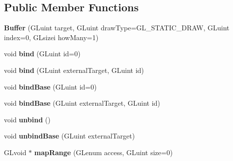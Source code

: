 \subsection*{Public Member Functions}
\begin{DoxyCompactItemize}
\item 
\hypertarget{classfillwave_1_1core_1_1Buffer_a0eb4bd71707615e42f8b9c5c6b35b4fa}{}{\bfseries Buffer} (G\+Luint target, G\+Luint draw\+Type=G\+L\+\_\+\+S\+T\+A\+T\+I\+C\+\_\+\+D\+R\+A\+W, G\+Luint index=0, G\+Lsizei how\+Many=1)\label{classfillwave_1_1core_1_1Buffer_a0eb4bd71707615e42f8b9c5c6b35b4fa}

\item 
\hypertarget{classfillwave_1_1core_1_1Buffer_a7d6935f9b25cfb6e66445ad407bf9c89}{}void {\bfseries bind} (G\+Luint id=0)\label{classfillwave_1_1core_1_1Buffer_a7d6935f9b25cfb6e66445ad407bf9c89}

\item 
\hypertarget{classfillwave_1_1core_1_1Buffer_aaeb0c23a07e78d00ae33105c61d9c3de}{}void {\bfseries bind} (G\+Luint external\+Target, G\+Luint id)\label{classfillwave_1_1core_1_1Buffer_aaeb0c23a07e78d00ae33105c61d9c3de}

\item 
\hypertarget{classfillwave_1_1core_1_1Buffer_a58c8a55440a60a1e63531c32281a301b}{}void {\bfseries bind\+Base} (G\+Luint id=0)\label{classfillwave_1_1core_1_1Buffer_a58c8a55440a60a1e63531c32281a301b}

\item 
\hypertarget{classfillwave_1_1core_1_1Buffer_ac945a26239edca798eba081d3d78c05e}{}void {\bfseries bind\+Base} (G\+Luint external\+Target, G\+Luint id)\label{classfillwave_1_1core_1_1Buffer_ac945a26239edca798eba081d3d78c05e}

\item 
\hypertarget{classfillwave_1_1core_1_1Buffer_ac6a6349e4040634ac8f30b63d47267fd}{}void {\bfseries unbind} ()\label{classfillwave_1_1core_1_1Buffer_ac6a6349e4040634ac8f30b63d47267fd}

\item 
\hypertarget{classfillwave_1_1core_1_1Buffer_ab2cc00ce071c66ab404940ed6794e22b}{}void {\bfseries unbind\+Base} (G\+Luint external\+Target)\label{classfillwave_1_1core_1_1Buffer_ab2cc00ce071c66ab404940ed6794e22b}

\item 
\hypertarget{classfillwave_1_1core_1_1Buffer_a8c4dd179a3d765a44368707241d9a5ec}{}G\+Lvoid $\ast$ {\bfseries map\+Range} (G\+Lenum access, G\+Luint size=0)\label{classfillwave_1_1core_1_1Buffer_a8c4dd179a3d765a44368707241d9a5ec}


\end{DoxyCompactItemize}
